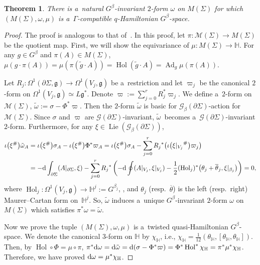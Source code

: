 \documentclass[pdftex]{sigma}
\numberwithin{equation}{section}
\newtheorem{Theorem}{Theorem}[section]
\theoremstyle{definition}
\newcommand{\Ad}{\operatorname{Ad}}
\newcommand{\Hol}{\operatorname{Hol}}
\newcommand{\Lie}{\operatorname{Lie}}
\newcommand{\bH}{\mathbb{H}}
\begin{document}
\begin{Theorem}\label{q-Ham str on M(X)}
 There is a~natural $G^{\beta}$-invariant $2$-form $\omega$ on $M(\Sigma)$ for which $(M(\Sigma),\omega,\mu)$ is a~$\Gamma$-compatible $q$-Hamiltonian $G^{\beta}$-space.
\end{Theorem}

\begin{proof}
 The proof is analogous to that of~\cite[Theorem 9.1]{AMM}.
 In this proof, let $\pi \colon \mathcal{M}(\Sigma) \to M(\Sigma) $ be the quotient map.
 First, we will show the equivariance of $\mu \colon M(\Sigma) \to \bH$.
 For any $g \in G^{\beta}$ and $\pi(A) \in M(\Sigma)$,
$\mu(g \cdot \pi(A)) = \mu (\pi(\tilde{g}\cdot A)) = \Hol(\tilde{g}\cdot A)= \Ad_{g} \mu(\pi(A))$.

Let $R_{j} \colon \Omega^1(\partial \Sigma, \mathfrak{g}) \to \Omega^1(V_j,\mathfrak{g})$ be a~restriction and let $\varpi_{j}$ be the canonical $2$-form on $\Omega^{1}(V_j, \mathfrak{g}) \simeq L\mathfrak{g}^*$.
 Denote $\varpi := \sum_{j=0}^{r} R_{j}^*\varpi_{j}$. We define a~$2$-form on $\mathcal{M}(\Sigma)$, $\tilde{\omega} := \sigma - \Phi^*\varpi$.
 Then the $2$-form $\tilde{\omega}$ is basic for $\mathcal{G}_{\beta}(\partial \Sigma)$-action for $\mathcal{M}(\Sigma)$.
 Since $\sigma$ and $\varpi$ are $\mathcal{G}(\partial \Sigma)$-invariant, $\tilde{\omega}$~becomes a~$\mathcal{G}(\partial \Sigma)$-invariant $2$-form.
 Furthermore, for any $\xi \in \Lie(\mathcal{G}_{\beta}(\partial \Sigma))$,
 \begin{align*}
 \iota\bigl(\xi^{\#}\bigr)\tilde{\omega}_A &= \iota\bigl(\xi^{\#}\bigr)\sigma_A - \iota\bigl(\xi^{\#}\bigr) \Phi^* \varpi_A
 = \iota\bigl(\xi^{\#}\bigr) \sigma_A - \sum_{j=0}^{r} {R_j}^* \bigl(\iota\bigl({\xi|_{V_j}}^{\#}\bigr)\varpi_j\bigr)\\
 &= -{\rm d} \int_{\partial \Sigma }(A|_{\partial \Sigma}, \xi)- \sum_{j=0}^{r} {R_{j}}^*\left(-{\rm d} \oint (A|_{V_j},\xi|_{V_j}) -\frac{1}{2}(\Hol_{j})^* \bigl(\theta_{j}+ \overline{\theta}_{j}, \xi|_{\beta_{j}}\bigr) \right)= 0,
 \end{align*}
 where $\Hol_j \colon \Omega^1(V_{j},\mathfrak{g}) \to \bH^{j} := G^{\beta_j}$, \smash{$A_j \mapsto \bigl(\Hol^{b^{j}_\lambda}_{b^{j}_\lambda}(A_j)\bigr)$}, and $\theta_j $ (resp.\ $\overline{\theta}$) is the left (resp.\ right) Maurer--Cartan form on~$\bH^j$.
 So, $\tilde{\omega}$ induces a~unique $G^{\beta}$-invariant $2$-form $\omega$ on $M(\Sigma)$ which satisfies $\pi^* \omega = \tilde{\omega}$.

 Now we prove the tuple $(M(\Sigma),\omega,\mu)$ is a~twisted quasi-Hamiltonian $G^{\beta}$-space.
 We denote the canonical $3$-form on $\bH$ by $\chi_{\bH}$, i.e., $\chi_{\bH} = \frac{1}{12}(\theta_{\bH},[\theta_{\bH},\theta_{\bH}])$.
 Then, by $\Hol \circ \Phi = \mu \circ \pi$,
$
 \pi^*{\rm d}\omega = {\rm d}\tilde{\omega}= {\rm d}( \sigma - \Phi^* \varpi)
 = \Phi^* \Hol^* \chi_{\bH}
 = \pi^* \mu^* \chi_{\bH}$.
 Therefore, we have proved ${\rm d} \omega = \mu^* \chi_{\bH}$.


\end{proof}
\end{document}
